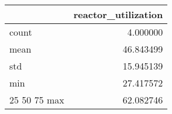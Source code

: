 \begin{tabular}{lr}
\toprule
 & reactor\_utilization \\
\midrule
count & 4.000000 \\
mean & 46.843499 \\
std & 15.945139 \\
min & 27.417572 \\
25%
50%
75%
max & 62.082746 \\
\bottomrule
\end{tabular}

